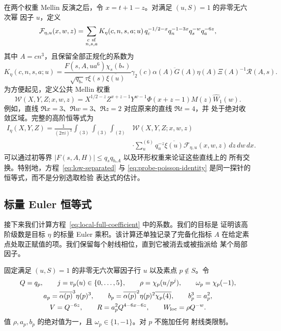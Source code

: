 在两个权重 Mellin 反演之后，令 $x=t+1-z$。对满足 $(u,S)=1$ 的非零无六次幂
因子 $u$，定义
\begin{equation}\label{eq:local-full-series}
 \mathcal F_{\eta,u}(x,w,z)=
 \sum_{\substack{c\ {\rm sf}\\n,s,a}}
 K_\eta(c,n,s,a;u)\,
 q_c^{-1/2-x}q_n^{-1-3x}q_s^{-w}q_a^{-6z},
\end{equation}
其中 $A=cn^3$，且保留全部正规化的系数为
\begin{equation}\label{eq:local-full-coefficient}
 K_\eta(c,n,s,a;u)=
 \frac{F(s,A,ua^6)\chi_s(b_*)}
 {\sqrt{q_{b_*}}\tau\xi(s)\overline{\xi(u)}}
 \gamma_2(c)\overline{\alpha(A)G(A)}
 \eta(A)\Xi(A)^{-1}\mathcal R(A,s).
\end{equation}
为方便起见，定义公共 Mellin 权重
\[
 \mathcal W(X,Y,Z;x,w,z)=
 X^{1/2-z}Z^{x+z-1}Y^{w-1}
 \Phi(x+z-1)M(z)\widehat W_1(w).
\]
例如，直线 $\Re x=3$、$\Re w=3$、$\Re z=2$ 对应原来的直线 $\Re t=4$，并
处于绝对收敛区域。完整的高阶恒等式为
\begin{equation}\label{eq:probe-poisson-identity}
 \begin{split}
 I_\eta(X,Y,Z)=\frac1{(2\pi i)^3}
 \int_{(3)}\int_{(3)}\int_{(2)}
 &\mathcal W(X,Y,Z;x,w,z)\\
 &\cdot\sum_u^{(6)}q_u^{-z}\overline{\xi(u)}
             \mathcal F_{\eta,u}(x,w,z)\,dz\,dw\,dx.
 \end{split}
\end{equation}
可以通过初等界 $|F(s,A,H)|\le q_sq_{b_*A}$ 以及环形权重来论证这些直线上的
所有交换。特别地，方程~\eqref{eq:low-separated} 与
\eqref{eq:probe-poisson-identity} 是同一探针的恒等式，而不是分别选取检验
表达式的估计。


\subsection{标量 Euler 恒等式}
\label{sec:local-euler}

接下来我们计算方程~\eqref{eq:local-full-coefficient} 中的系数。我们的目标是
证明该高阶级数是目标 $\eta$ 的标量 Euler 乘积。该计算还单独记录了完备化指标
$A$ 在给定素点处取正赋值的项。我们保留每个射线相位，直到它被消去或被指派给
某个局部因子。

固定满足 $(u,S)=1$ 的非零无六次幂因子行 $u$ 以及素点 $p\notin S$。令
\begin{equation}\label{eq:local-parameters}
 \begin{gathered}
 Q=q_p,\qquad j=v_p(u)\in\{0,\ldots,5\},\qquad
 \rho=\chi_p(u/p^j),\qquad \omega_p=\chi_p(-1),\\
 a_p=\overline{\alpha(p)}^3\eta(p)^3,\qquad
 b_p=\overline{\alpha(p)}^2\eta(p)^2\overline{\chi_p(4)},
 \qquad b_p^3=a_p^2,\\
 V=Q^{-6z},\qquad R=a_p^2Q^{4-6x-6z},\qquad
 W_{\rm loc}=\rho Q^{-w}.
 \end{gathered}
\end{equation}
值 $\rho,a_p,b_p$ 的绝对值为一，且 $\omega_p\in\{1,-1\}$。对 $p$ 不施加任何
射线类限制。

